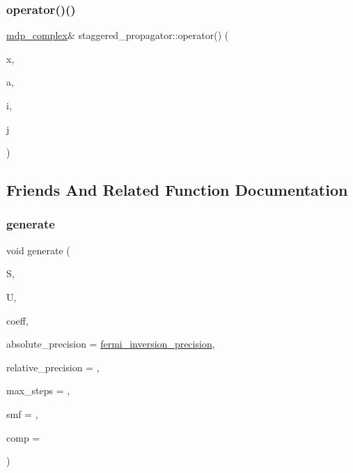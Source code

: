 \subsubsection{\texorpdfstring{operator()()}{operator()()}\hspace{0.1cm}{\footnotesize\ttfamily [2/2]}}
{\footnotesize\ttfamily \hyperlink{classmdp__complex}{mdp\+\_\+complex}\& staggered\+\_\+propagator\+::operator() (\begin{DoxyParamCaption}\item[{\hyperlink{mdp__compatibility__macros_8h_aa6f1179c424e48adef1cedf7c436eb75}{site}}]{x,  }\item[{int}]{a,  }\item[{int}]{i,  }\item[{int}]{j }\end{DoxyParamCaption})\hspace{0.3cm}{\ttfamily [inline]}}



\subsection{Friends And Related Function Documentation}
\mbox{\label{classstaggered__propagator_a7849b2db88d889afda04b4ee01476b64}} 
\subsubsection{\texorpdfstring{generate}{generate}}
{\footnotesize\ttfamily void generate (\begin{DoxyParamCaption}\item[{\hyperlink{classstaggered__propagator}{staggered\+\_\+propagator} \&}]{S,  }\item[{\hyperlink{classgauge__field}{gauge\+\_\+field} \&}]{U,  }\item[{\hyperlink{classcoefficients}{coefficients} \&}]{coeff,  }\item[{\hyperlink{mdp__global__vars_8h_a69d96b74c791e0bbdb888b3913a69450}{mdp\+\_\+real}}]{absolute\+\_\+precision = {\ttfamily \hyperlink{fermiqcd__default__parameters_8h_ab11c95dc923c6bfd349bd67af277d59d}{fermi\+\_\+inversion\+\_\+precision}},  }\item[{\hyperlink{mdp__global__vars_8h_a69d96b74c791e0bbdb888b3913a69450}{mdp\+\_\+real}}]{relative\+\_\+precision = {},  }\item[{int}]{max\+\_\+steps = {},  }\item[{void($\ast$)(\hyperlink{classstaggered__field}{staggered\+\_\+field} \&, \hyperlink{classgauge__field}{gauge\+\_\+field} \&)}]{smf = {},  }\item[{int}]{comp = {} }\end{DoxyParamCaption})\hspace{0.3cm}{\ttfamily [friend]}}




